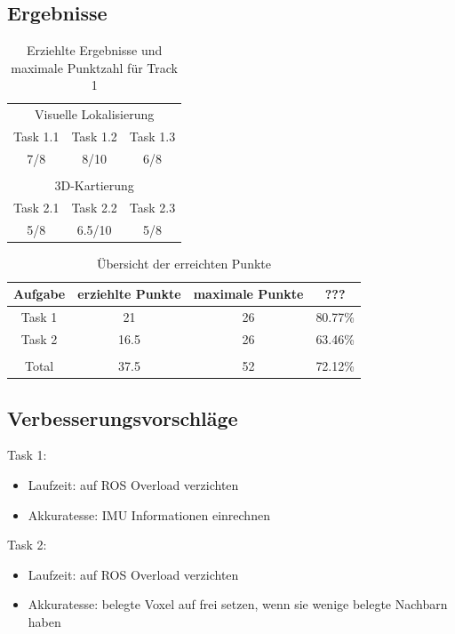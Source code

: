 \documentclass[12pt,titlepage, a4paper]{article}
\begin{document}
\subsection{Ergebnisse}
\FloatBarrier
\begin{table}[h!]
\centering
\begin{tabular}{c|c|c}
\multicolumn{3}{c}{Visuelle Lokalisierung}\vspace{2mm}\\
Task 1.1 & Task 1.2 & Task 1.3\\
\hline\vspace{2mm}
7/8 & 8/10 & 6/8\\
\multicolumn{3}{c}{ }\\
\multicolumn{3}{c}{3D-Kartierung}\vspace{2mm}\\
Task 2.1 & Task 2.2 & Task 2.3\\
\hline\vspace{2mm}
5/8 & 6.5/10 & 5/8\\
\end{tabular}
\caption{Erziehlte Ergebnisse und maximale Punktzahl für Track 1}
\label{table:finalscore1}
\end{table}

\begin{table}[h!]
\centering
\begin{tabular}{c|c|c|c}
Aufgabe & erziehlte Punkte & maximale Punkte & ???\\
\hline
Task 1 & 21 & 26 & 80.77\% \\
Task 2 & 16.5 & 26 & 63.46\% \\
\hline
\hline
 & & \\
Total & 37.5 & 52 & 72.12\%\\
\end{tabular}
\caption{Übersicht der erreichten Punkte}
\label{table:finalscore2}
\end{table}

\FloatBarrier

\subsection{Verbesserungsvorschläge}

Task 1:
\begin{itemize}
	\item{Laufzeit: auf ROS Overload verzichten}
	\item{Akkuratesse: IMU Informationen einrechnen}
\end{itemize}

Task 2:
\begin{itemize}
	\item{Laufzeit: auf ROS Overload verzichten}
	\item{Akkuratesse: belegte Voxel auf frei setzen, wenn sie wenige belegte Nachbarn haben}
\end{itemize}




\end{document}
